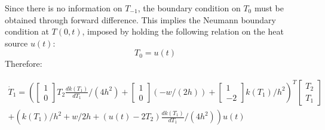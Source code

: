 


Since there is no information on $T_{-1}$, the boundary condition on $T_0$ must be obtained through forward difference.
%
This implies the Neumann boundary condition at $T(0,t)$, imposed by holding the following relation on the heat source $u(t)$:
\begin{equation}
    T_0 = u(t)
\end{equation}
Therefore:

\begin{multline} \label{eqn:fdm_boundary1}
  \dot{T}_1 =
  \left(
  \begin{bmatrix}
     1\\
     0
  \end{bmatrix}
  T_2\frac{d k(T_1) }{d T_1}/(4h^2) +
  \begin{bmatrix}
     1\\
     0
  \end{bmatrix}(- w/(2h)) +
  \begin{bmatrix}
     1\\
     -2
  \end{bmatrix}k(T_1)/h^2\right)^T
  \begin{bmatrix}
      T_2\\
      T_1
  \end{bmatrix}\\
  + \left (k(T_1)/h^2 + w/2h + ( u(t) - 2T_2)\frac{d k(T_1) }{d T_1}/(4h^2)\right )u(t)
\end{multline}



